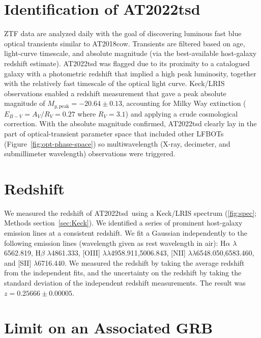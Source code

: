\documentclass{nature_plusfigure}
\newcommand{\at}{AT2022tsd}
\begin{document}
\begin{methods}

\section{Identification of \at}
\label{Methods:Identification}

ZTF data are analyzed daily with the goal of discovering luminous fast blue optical transients similar to AT2018cow.
Transients are filtered based on age, light-curve timescale, and absolute magnitude (via the best-available host-galaxy redshift estimate).
AT2022tsd was flagged due to its proximity to a catalogued galaxy with a photometric redshift that implied a high peak luminosity, together with the relatively fast timescale of the optical light curve.
Keck/LRIS observations enabled a redshift measurement that gave a peak absolute magnitude of $M_{g, \mathrm{peak}}=-20.64\pm0.13$, accounting for Milky Way extinction ($E_{B-V}=A_V/R_V=0.27$ where $R_V=3.1$)\cite{Finkbeiner1999,Schlegel1998,Schlafly2011} and applying a crude cosmological correction.
With the absolute magnitude confirmed, AT2022tsd clearly lay in the part of optical-transient parameter space that included other LFBOTs (Figure~\ref{fig:opt-phase-space}) so
multiwavelength (X-ray, decimeter, and submillimeter wavelength) observations were triggered.

\section{Redshift}
\label{sec:redshift}

We measured the redshift of \at\ using a Keck/LRIS spectrum (\ref{fig:spec}; Methods section~\ref{sec:Keck}).
We identified a series of prominent host-galaxy emission lines at a consistent redshift.
We fit a Gaussian independently to the following emission lines (wavelength given as rest wavelength in air): H$\alpha$ $\lambda$6562.819, H$\beta$ $\lambda$4861.333, 
 [OIII] $\lambda$$\lambda$4958.911,5006.843, 
  [NII] $\lambda$$\lambda$6548.050,6583.460, and [SII] $\lambda$6716.440. 
We measured the redshift by taking the average redshift from the independent fits, and the uncertainty on the redshift by taking the standard deviation of the independent redshift measurements.
The result was $z=0.25666\pm0.00005$.

\section{Limit on an Associated GRB}
\label{sec:grbsearch}


\end{methods}
\end{document}
